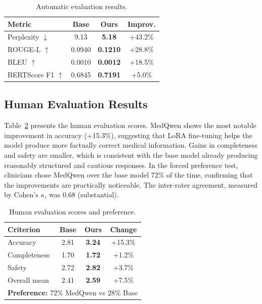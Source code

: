 \documentclass[12pt,a4paper]{article}
\begin{document}
\begin{table}[ht]
\centering
\caption{Automatic evaluation results.}
\label{tab:main_results}
\begin{tabular}{lccc}
\toprule
\textbf{Metric} & \textbf{Base} & \textbf{Ours} & \textbf{Improv.} \\
\midrule
Perplexity $\downarrow$ & 9.13 & \textbf{5.18} & +43.2\% \\
ROUGE-L $\uparrow$ & 0.0940 & \textbf{0.1210} & +28.8\% \\
BLEU $\uparrow$ & 0.0010 & \textbf{0.0012} & +18.5\% \\
BERTScore F1 $\uparrow$ & 0.6845 & \textbf{0.7191} & +5.0\% \\
\bottomrule
\end{tabular}
\end{table}

\subsection{Human Evaluation Results}

Table~\ref{tab:human_results} presents the human evaluation scores. MedQwen shows the most notable improvement in accuracy (+15.3\%), suggesting that LoRA fine-tuning helps the model produce more factually correct medical information. Gains in completeness and safety are smaller, which is consistent with the base model already producing reasonably structured and cautious responses. In the forced preference test, clinicians chose MedQwen over the base model 72\% of the time, confirming that the improvements are practically noticeable. The inter-rater agreement, measured by Cohen's $\kappa$, was 0.68 (substantial).

\begin{table}[ht]
\centering
\caption{Human evaluation scores and preference.}
\label{tab:human_results}
\begin{tabular}{lccc}
\toprule
\textbf{Criterion} & \textbf{Base} & \textbf{Ours} & \textbf{Change} \\
\midrule
Accuracy & 2.81 & \textbf{3.24} & +15.3\% \\
Completeness & 1.70 & \textbf{1.72} & +1.2\% \\
Safety & 2.72 & \textbf{2.82} & +3.7\% \\
\midrule
Overall mean & 2.41 & \textbf{2.59} & +7.5\% \\
\midrule
\multicolumn{4}{l}{\textbf{Preference:} 72\% MedQwen vs 28\% Base} \\
\bottomrule
\end{tabular}
\end{table}
\end{document}
